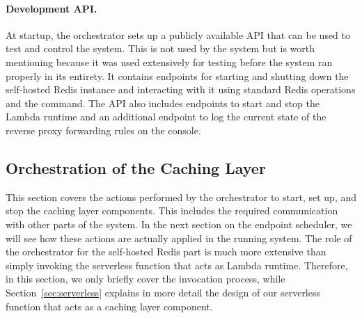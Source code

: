\paragraph{Development API.} At startup, the orchestrator sets up a publicly available API that can be used to test and control the system. This is not used by the system but is worth mentioning because it was used extensively for testing before the system ran properly in its entirety. It contains endpoints for starting and shutting down the self-hosted Redis instance and interacting with it using standard Redis operations and the  command. The API also includes endpoints to start and stop the Lambda runtime and an additional endpoint to log the current state of the reverse proxy forwarding rules on the console.  

\subsection{Orchestration of the Caching Layer}
\label{subsec:orchestration_cachinglayer}
This section covers the actions performed by the orchestrator to start, set up, and stop the caching layer components. This includes the required communication with other parts of the system. In the next section on the endpoint scheduler, we will see how these actions are actually applied in the running system. The role of the orchestrator for the self-hosted Redis part is much more extensive than simply invoking the serverless function that acts as Lambda runtime. Therefore, in this section, we only briefly cover the invocation process, while Section~\ref{sec:serverless} explains in more detail the design of our serverless function that acts as a caching layer component.

